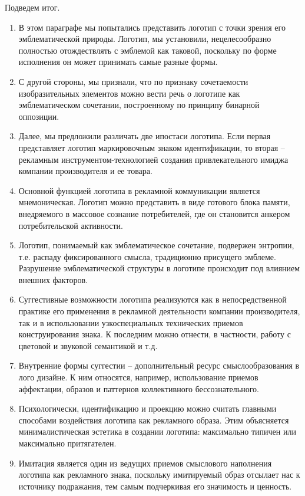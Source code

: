 Подведем итог.
\begin{enumerate}
\item В этом параграфе мы попытались представить логотип с точки зрения
  его эмблематической природы. Логотип, мы установили, нецелесообразно
  полностью отождествлять с эмблемой как таковой, поскольку по форме исполнения
  он может принимать самые разные формы.
\item С другой стороны, мы признали, что по признаку сочетаемости
  изобразительных элементов можно вести речь о логотипе как эмблематическом
  сочетании, построенному по принципу бинарной оппозиции.
\item Далее, мы предложили различать две ипостаси логотипа. Если первая
  представляет логотип маркировочным знаком идентификации, то вторая --
  рекламным инструментом-технологией создания привлекательного имиджа
  компании производителя и ее товара.
\item Основной функцией логотипа в рекламной коммуникации является
  мнемоническая. Логотип можно представить в виде готового блока памяти,
  внедряемого в массовое сознание потребителей, где он становится анкером
  потребительской активности.
\item Логотип, понимаемый как эмблематическое сочетание, подвержен энтропии,
  т.е. распаду фиксированного смысла, традиционно присущего эмблеме.
  Разрушение эмблематической структуры в логотипе происходит под влиянием
  внешних факторов.
\item Суггестивные возможности логотипа реализуются как в непосредственной
  практике его применения в рекламной деятельности компании производителя,
  так и в использовании узкоспециальных технических приемов конструирования
  знака. К последним можно отнести, в частности, работу с цветовой и звуковой
  семантикой и т.д.
\item Внутренние формы суггестии -- дополнительный ресурс смыслообразования
  в лого дизайне. К ним относятся, например, использование приемов аффектации,
  образов и паттернов коллективного бессознательного.
\item Психологически, идентификацию и проекцию можно считать главными
  способами воздействия логотипа как рекламного образа. Этим объясняется
  минималистическая эстетика в создании логотипа: максимально типичен или
  максимально притягателен.
\item Имитация является один из ведущих приемов смыслового наполнения
  логотипа как рекламного знака, поскольку имитируемый образ отсылает нас к
  источнику подражания, тем самым подчеркивая его значимость и ценность.

\end{enumerate}
